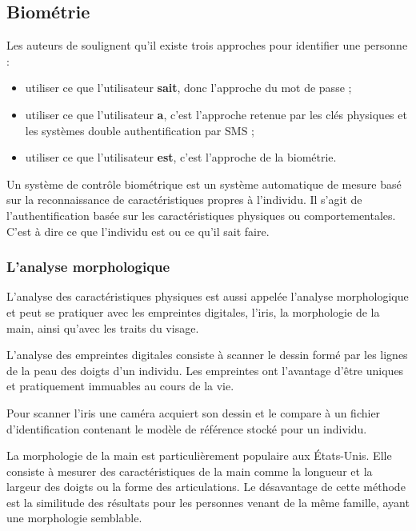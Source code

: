 \subsection{Biométrie}

Les auteurs de  soulignent qu'il existe trois approches pour identifier une personne :

\begin{itemize}
	\item utiliser ce que l'utilisateur \textbf{sait}, donc l'approche du mot de passe ;
	\item utiliser ce que l'utilisateur \textbf{a}, c'est l'approche retenue par les clés physiques et les systèmes double authentification par SMS ;
	\item utiliser ce que l'utilisateur \textbf{est}, c'est l'approche de la biométrie.
\end{itemize}

Un système de contrôle biométrique est un système automatique de mesure basé sur la reconnaissance de caractéristiques propres à l'individu. Il s'agit de l'authentification basée sur les caractéristiques physiques ou comportementales. C'est à dire ce que l'individu est ou ce qu'il sait faire.

\subsubsection{L'analyse morphologique}

L'analyse des caractéristiques physiques est aussi appelée l'analyse morphologique et peut se pratiquer avec les empreintes digitales, l'iris, la morphologie de la main, ainsi qu'avec les traits du visage.

L'analyse des empreintes digitales consiste à scanner le dessin formé par les lignes de la peau des doigts d'un individu. Les empreintes ont l'avantage d'être uniques et pratiquement immuables au cours de la vie.

Pour scanner l'iris une caméra acquiert son dessin et le compare à un fichier d'identification contenant le modèle de référence stocké pour un individu.

La morphologie de la main est particulièrement populaire aux États-Unis. Elle consiste à mesurer des caractéristiques de la main comme la longueur et la largeur des doigts ou la forme des articulations. Le désavantage de cette méthode est la similitude des résultats pour les personnes venant de la même famille, ayant une morphologie semblable.

